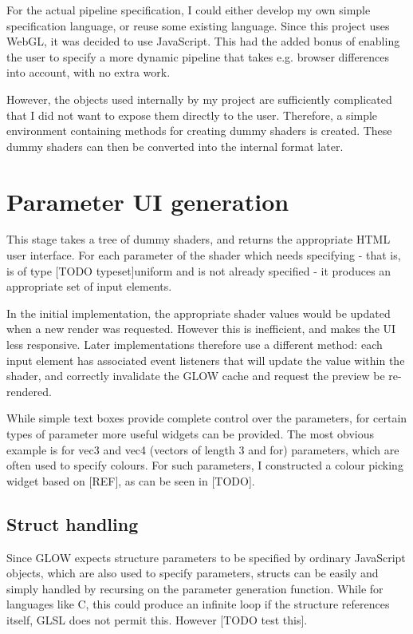 \documentclass[12pt,twoside,notitlepage]{report}
\begin{document}
For the actual pipeline specification, I could either develop my own simple specification language, or reuse some existing language. Since this project uses WebGL, it was decided to use JavaScript. This had the added bonus of enabling the user to specify a more dynamic pipeline that takes e.g. browser differences into account, with no extra work.

However, the objects used internally by my project are sufficiently complicated that I did not want to expose them directly to the user. Therefore, a simple environment containing methods for creating dummy shaders is created. These dummy shaders can then be converted into the internal format later.

\section{Parameter UI generation}
This stage takes a tree of dummy shaders, and returns the appropriate HTML user interface. For each parameter of the shader which needs specifying - that is, is of type [TODO typeset]uniform and is not already specified - it produces an appropriate set of input elements. 

In the initial implementation, the appropriate shader values would be updated when a new render was requested. However this is inefficient, and makes the UI less responsive. Later implementations therefore use a different method: each input element has associated event listeners that will update the value within the shader, and correctly invalidate the GLOW cache and request the preview be re-rendered.

While simple text boxes provide complete control over the parameters, for certain types of parameter more useful widgets can be provided. The most obvious example is for vec3 and vec4 (vectors of length 3 and for) parameters, which are often used to specify colours. For such parameters, I constructed a colour picking widget based on [REF], as can be seen in [TODO].

\subsection{Struct handling}
Since GLOW expects structure parameters to be specified by ordinary JavaScript objects, which are also used to specify parameters, structs can be easily and simply handled by recursing on the parameter generation function. While for languages like C, this could produce an infinite loop if the structure references itself, GLSL does not permit this. However [TODO test this].
\end{document}
